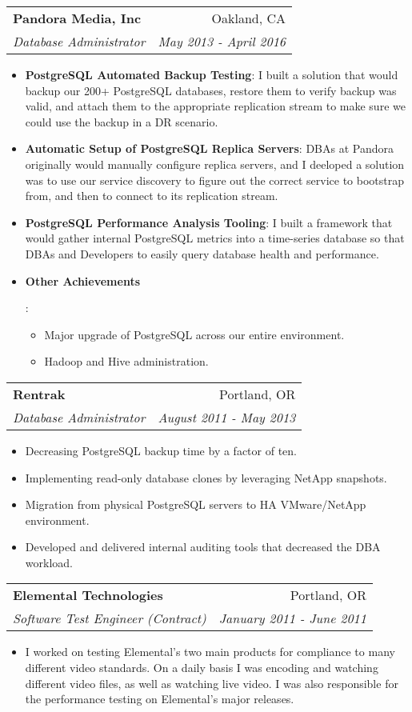 \documentclass[letterpaper,11pt]{article}
\makeatletter
\newcommand{\resumeItem}[2]{
  \item\small{
    \textbf{#1}{: #2 \vspace{-2pt}}
  }
}
\newcommand{\resumeSubheading}[4]{
  \vspace{-1pt}\item
    \begin{tabular*}{0.97\textwidth}{l@{\extracolsep{\fill}}r}
      \textbf{#1} & #2 \\
      \textit{\small#3} & \textit{\small #4} \\
    \end{tabular*}\vspace{-5pt}
}
\newcommand{\resumeItemListStart}{\begin{itemize}}
\newcommand{\resumeItemListEnd}{\end{itemize}\vspace{-5pt}}
\makeatother
\begin{document}
    \resumeSubheading
      {Pandora Media, Inc}{Oakland, CA}
      {Database Administrator}{May 2013 - April 2016}
      \resumeItemListStart
        \resumeItem{PostgreSQL Automated Backup Testing}
          {I built a solution that would backup our 200+ PostgreSQL databases, restore them to verify backup was valid, and attach them to the appropriate replication stream to make sure we could use the backup in a DR scenario.}
        \resumeItem{Automatic Setup of PostgreSQL Replica Servers}
          {DBAs at Pandora originally would manually configure replica servers, and I deeloped a solution was to use our service discovery to figure out the correct service to bootstrap from, and then to connect to its replication stream.}
        \resumeItem{PostgreSQL Performance Analysis Tooling}
          {I built a framework that would gather internal PostgreSQL metrics into a time-series database so that DBAs and Developers to easily query database health and performance.}
        \resumeItem{Other Achievements}
          {
            \begin{itemize}[noitemsep]
            \item Major upgrade of PostgreSQL across our entire environment.
            \item Hadoop and Hive administration.
            \end{itemize}
          }
      \resumeItemListEnd

    \resumeSubheading
      {Rentrak}{Portland, OR}
      {Database Administrator}{August 2011 - May 2013}
        \begin{itemize}[noitemsep]
        \item Decreasing PostgreSQL backup time by a factor of ten.
        \item Implementing read-only database clones by leveraging NetApp snapshots.
        \item Migration from physical PostgreSQL servers to HA VMware/NetApp environment.
        \item Developed and delivered internal auditing tools that decreased the DBA workload.
        \end{itemize}

    \resumeSubheading
      {Elemental Technologies}{Portland, OR}
      {Software Test Engineer (Contract)}{January 2011 - June 2011}
        \begin{itemize}[noitemsep]
        \item I worked on testing Elemental's two main products for compliance to many different video standards. On a daily basis I was encoding and watching different video files, as well as watching live video. I was also responsible for the performance testing on Elemental's major releases.
         \end{itemize}
\end{document}
